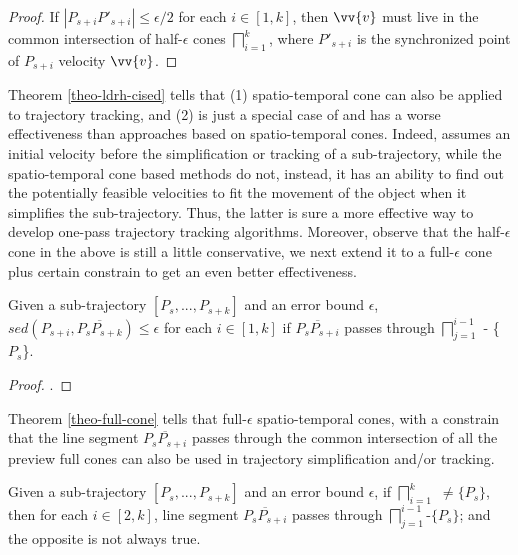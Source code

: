 \begin{proof}

If $|P_{s+i}P'_{s+i}|\le \epsilon/2$ for each $i \in [1,k]$, then $\vv{v}$ must live in the common intersection of half-$\epsilon$ cones $\bigsqcap_{i=1}^{k}$, where $P'_{s+i}$ is the synchronized point of $P_{s+i}$ \wrt velocity $\vv{v}$.
\end{proof}

Theorem \ref{theo-ldrh-cised} tells that (1) {spatio-temporal cone can also be applied to trajectory tracking}, and (2) \ldrh is just a special case of and has a worse effectiveness than approaches based on spatio-temporal cones. Indeed, \ldrh assumes an initial velocity before the simplification or tracking of a sub-trajectory, while the spatio-temporal cone based methods do not, instead, it has an ability to find out the potentially feasible velocities to fit the movement of the object when it simplifies the sub-trajectory. Thus, the latter is sure a more effective way to develop one-pass trajectory tracking algorithms. 
%
Moreover, observe that the half-$\epsilon$ cone in the above is still a little conservative, we next extend it to a full-$\epsilon$ cone plus certain constrain to get an even better effectiveness.


\begin{theorem}
	\label{theo-full-cone}
	Given a sub-trajectory $[P_s,...,P_{s+k}]$ and an error bound $\epsilon$, $sed(P_{s+i}, \overline{P_sP_{s+k}})\le \epsilon$ for each $i \in [1,k]$ if $\overline{P_sP_{s+i}}$ passes through $\bigsqcap_{j=1}^{i-1}$ - \{$P_s$\}.
\end{theorem}

\begin{proof}
	\todo.
\end{proof}

Theorem \ref{theo-full-cone} tells that full-$\epsilon$ spatio-temporal cones, with a constrain that the line segment $\overline{P_sP_{s+i}}$ passes through the common intersection of all the preview full cones can also be used in trajectory simplification and/or tracking. 

\begin{theorem}
	\label{theo-cone-vs}
	Given a sub-trajectory $[P_s,...,P_{s+k}]$ and an error bound $\epsilon$, if $\bigsqcap_{i=1}^{k}$ $\ne \{P_s\}$, then for each $i \in [2, k]$, line segment $\overline{P_sP_{s+i}}$ passes through $\bigsqcap_{j=1}^{i-1}$-$\{P_s\}$; and the opposite is not always true.
\end{theorem}

